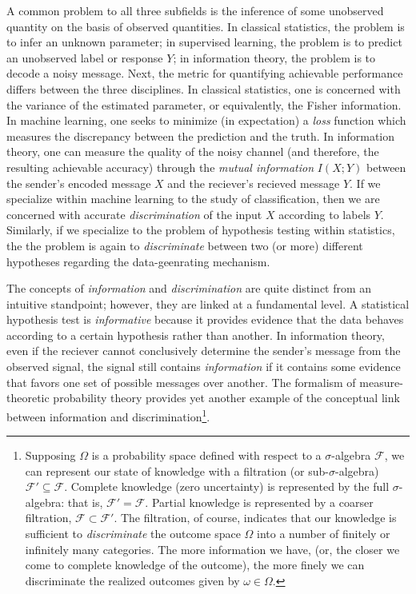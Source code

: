 A common problem to all three subfields is the inference of some
unobserved quantity on the basis of observed quantities.  In classical
statistics, the problem is to infer an unknown parameter; in
supervised learning, the problem is to predict an unobserved label or
response $Y$; in information theory, the problem is to decode a noisy
message.  Next, the metric for quantifying achievable performance
differs between the three disciplines.  In classical statistics, one
is concerned with the variance of the estimated parameter, or
equivalently, the Fisher information.  In machine learning, one seeks
to minimize (in expectation) a \emph{loss} function which measures the
discrepancy between the prediction and the truth.  In information
theory, one can measure the quality of the noisy channel (and
therefore, the resulting achievable accuracy) through the \emph{mutual
  information} $I(X; Y)$ between the sender's encoded message $X$ and
the reciever's recieved message $Y$.  If we specialize within machine
learning to the study of classification, then we are concerned with
accurate \emph{discrimination} of the input $X$ according to labels
$Y$.  Similarly, if we specialize to the problem of hypothesis testing
within statistics, the the problem is again to \emph{discriminate}
between two (or more) different hypotheses regarding the
data-geenrating mechanism.

The concepts of \emph{information} and \emph{discrimination} are quite
distinct from an intuitive standpoint; however, they are linked at a
fundamental level.  
A statistical hypothesis test is \emph{informative} because it
provides evidence that the data behaves according to a certain
hypothesis rather than another.  %
In information theory, even if the reciever cannot conclusively
determine the sender's message from the observed signal, the signal
still contains \emph{information} if it contains some evidence that
favors one set of possible messages over another.  The formalism of
measure-theoretic probability theory provides yet another example of
the conceptual link between information and
discrimination\footnote{Supposing $\Omega$ is a probability space
  defined with respect to a $\sigma$-algebra $\mathcal{F}$, we can
  represent our state of knowledge with a filtration (or
  sub-$\sigma$-algebra) $\mathcal{F}' \subseteq \mathcal{F}$.
  Complete knowledge (zero uncertainty) is represented by the full
  $\sigma$-algebra: that is, $\mathcal{F}' = \mathcal{F}$.  Partial
  knowledge is represented by a coarser filtration, $\mathcal{F}
  \subset \mathcal{F}'$.  The filtration, of course, indicates that
  our knowledge is sufficient to \emph{discriminate} the outcome space
  $\Omega$ into a number of finitely or infinitely many categories.
  The more information we have, (or, the closer we come to complete
  knowledge of the outcome), the more finely we can discriminate the
  realized outcomes given by $\omega \in \Omega$.}.

